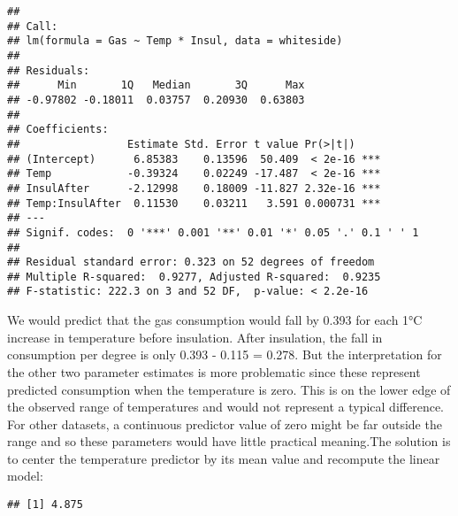 \documentclass[
]{article}
\newenvironment{Shaded}{\begin{snugshade}}{\end{snugshade}}
\newcommand{\KeywordTok}[1]{\textcolor[rgb]{0.13,0.29,0.53}{\textbf{#1}}}
\newcommand{\NormalTok}[1]{#1}
\newcommand{\OperatorTok}[1]{\textcolor[rgb]{0.81,0.36,0.00}{\textbf{#1}}}
\newcommand{\StringTok}[1]{\textcolor[rgb]{0.31,0.60,0.02}{#1}}
\begin{document}
\begin{verbatim}
## 
## Call:
## lm(formula = Gas ~ Temp * Insul, data = whiteside)
## 
## Residuals:
##      Min       1Q   Median       3Q      Max 
## -0.97802 -0.18011  0.03757  0.20930  0.63803 
## 
## Coefficients:
##                 Estimate Std. Error t value Pr(>|t|)    
## (Intercept)      6.85383    0.13596  50.409  < 2e-16 ***
## Temp            -0.39324    0.02249 -17.487  < 2e-16 ***
## InsulAfter      -2.12998    0.18009 -11.827 2.32e-16 ***
## Temp:InsulAfter  0.11530    0.03211   3.591 0.000731 ***
## ---
## Signif. codes:  0 '***' 0.001 '**' 0.01 '*' 0.05 '.' 0.1 ' ' 1
## 
## Residual standard error: 0.323 on 52 degrees of freedom
## Multiple R-squared:  0.9277, Adjusted R-squared:  0.9235 
## F-statistic: 222.3 on 3 and 52 DF,  p-value: < 2.2e-16
\end{verbatim}

We would predict that the gas consumption would fall by 0.393 for each
1°C increase in temperature before insulation. After insulation, the
fall in consumption per degree is only 0.393 - 0.115 = 0.278. But the
interpretation for the other two parameter estimates is more problematic
since these represent predicted consumption when the temperature is
zero. This is on the lower edge of the observed range of temperatures
and would not represent a typical difference. For other datasets, a
continuous predictor value of zero might be far outside the range and so
these parameters would have little practical meaning.The solution is to
center the temperature predictor by its mean value and recompute the
linear model:

\begin{Shaded}
\end{Shaded}

\begin{verbatim}
## [1] 4.875
\end{verbatim}

\begin{Shaded}
\end{Shaded}
\end{document}
